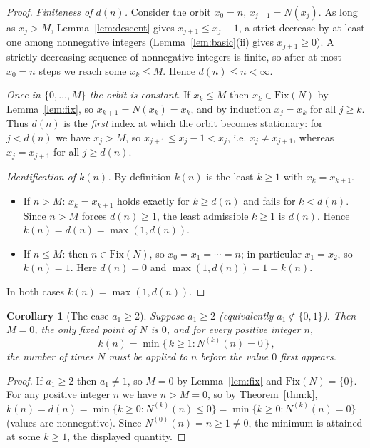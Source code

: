 \documentclass[12pt]{article}
\newtheorem{corollary}{Corollary}
\theoremstyle{definition}
\begin{document}
\begin{proof}
\emph{Finiteness of $d(n)$.} Consider the orbit $x_0=n$, $x_{j+1}=N(x_j)$. As long as
$x_j>M$, Lemma~\ref{lem:descent} gives $x_{j+1}\le x_j-1$, a strict decrease by at
least one among nonnegative integers (Lemma~\ref{lem:basic}(ii) gives $x_{j+1}\ge0$).
A strictly decreasing sequence of nonnegative integers is finite, so after at most
$x_0=n$ steps we reach some $x_k\le M$. Hence $d(n)\le n<\infty$.

\emph{Once in $\{0,\dots,M\}$ the orbit is constant.} If $x_k\le M$ then
$x_k\in\mathrm{Fix}(N)$ by Lemma~\ref{lem:fix}, so $x_{k+1}=N(x_k)=x_k$, and by
induction $x_j=x_k$ for all $j\ge k$. Thus $d(n)$ is the \emph{first} index at which
the orbit becomes stationary: for $j<d(n)$ we have $x_j>M$, so
$x_{j+1}\le x_j-1<x_j$, i.e. $x_j\ne x_{j+1}$, whereas $x_j=x_{j+1}$ for all
$j\ge d(n)$.

\emph{Identification of $k(n)$.} By definition $k(n)$ is the least $k\ge 1$ with
$x_k=x_{k+1}$.
\begin{itemize}
\item If $n>M$: $x_k=x_{k+1}$ holds exactly for $k\ge d(n)$ and fails for $k<d(n)$.
Since $n>M$ forces $d(n)\ge 1$, the least admissible $k\ge1$ is $d(n)$. Hence
$k(n)=d(n)=\max(1,d(n))$.
\item If $n\le M$: then $n\in\mathrm{Fix}(N)$, so $x_0=x_1=\cdots=n$; in particular
$x_1=x_2$, so $k(n)=1$. Here $d(n)=0$ and $\max(1,d(n))=1=k(n)$.
\end{itemize}
In both cases $k(n)=\max(1,d(n))$.
\end{proof}

\begin{corollary}[The case $a_1\ge 2$]\label{cor:a1ge2}
Suppose $a_1\ge 2$ (equivalently $a_1\notin\{0,1\}$). Then $M=0$, the only fixed point
of $N$ is $0$, and for every positive integer $n$,
\[
  \boxed{\,k(n)=\min\{\,k\ge 1: N^{(k)}(n)=0\,\}\,,}
\]
the number of times $N$ must be applied to $n$ before the value $0$ first appears.
\end{corollary}

\begin{proof}
If $a_1\ge 2$ then $a_1\ne1$, so $M=0$ by Lemma~\ref{lem:fix} and
$\mathrm{Fix}(N)=\{0\}$. For any positive integer $n$ we have $n>M=0$, so by
Theorem~\ref{thm:k}, $k(n)=d(n)=\min\{k\ge0:N^{(k)}(n)\le0\}=\min\{k\ge0:N^{(k)}(n)=0\}$
(values are nonnegative). Since $N^{(0)}(n)=n\ge1\ne0$, the minimum is attained at
some $k\ge1$, the displayed quantity.
\end{proof}
\end{document}
